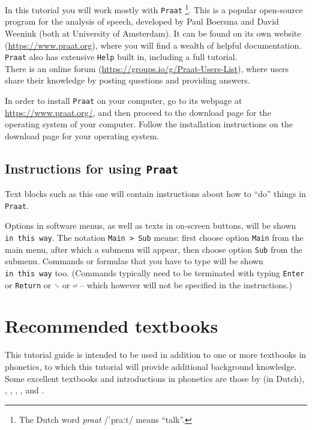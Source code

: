 \documentclass[
]{book}
\begin{document}
In this tutorial you will work mostly with \texttt{Praat} \citep{Boersma_Weenink_2024}\footnote{The Dutch word \emph{praat} /ˈpraːt/ means ``talk''.}. This is a popular open-source program for the analysis of speech, developed by Paul Boersma and David Weenink (both at University of Amsterdam). It can be found on its own website (\url{https://www.praat.org}), where you will find a wealth of helpful documentation. \texttt{Praat} also has extensive \texttt{Help} built in, including a full tutorial.\\
There is an online forum (\url{https://groups.io/g/Praat-Users-List}), where users share their knowledge by posting questions and providing answers.

In order to install \texttt{Praat} on your computer, go to its webpage at \url{https://www.praat.org/}, and then proceed to the download page for the operating system of your computer. Follow the installation instructions on the download page for your operating system.

\protect{}\label{tech-layout}
\subsection*{\texorpdfstring{Instructions for using \texttt{Praat}}{Instructions for using Praat}}\label{instructions-for-using-praat}

Text blocks such as this one will contain instructions about how to ``do'' things in \texttt{Praat}.

Options in software menus, as well as texts in on-screen buttons, will be shown \texttt{in\ this\ way}.
The notation \texttt{Main\ \textgreater{}\ Sub} means: first choose option \texttt{Main} from the main menu, after which a submenu will appear, then choose option \texttt{Sub} from the submenu.
Commands or formulas that you have to type will be shown \texttt{in\ this\ way} too. (Commands typically need to be terminated with typing \texttt{Enter} or \texttt{Return} or \texttt{␍} or \texttt{⏎} -- which however will not be specified in the instructions.)

\section{Recommended textbooks}\label{sec:textbooks}

This tutorial guide is intended to be used in addition to one or more textbooks in phonetics, to which this tutorial will provide additional background knowledge.
Some excellent textbooks and introductions in phonetics are those by
\citet{Rietveld_VanHeuven_2009} (in Dutch),
\citet{Johnson_2012},
\citet{Ladefoged_Johnson_2015},
\citet{Reetz_Jongman_2020},
\citet{Beňuš_2021}, and
\citet{Zsiga_2024}.
\end{document}
